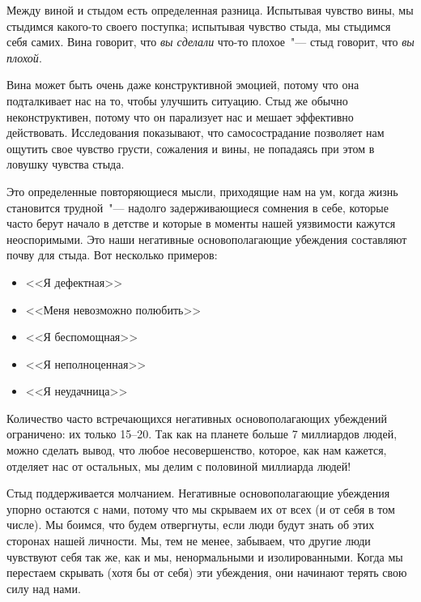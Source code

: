 Между виной и стыдом есть определенная разница. Испытывая чувство вины, мы стыдимся какого-то своего поступка; испытывая чувство стыда, мы стыдимся себя самих. Вина говорит, что \emph{вы сделали} что-то плохое~"--- стыд говорит, что \emph{вы плохой}. 

Вина может быть очень даже конструктивной эмоцией, потому что она подталкивает нас на то, чтобы улучшить ситуацию. Стыд же обычно неконструктивен, потому что он парализует нас и мешает эффективно действовать. Исследования показывают, что самосострадание позволяет нам ощутить свое чувство грусти, сожаления и вины, не попадаясь при этом в ловушку чувства стыда. 

\vspace{3ex}


\vspace{1ex}

Это определенные повторяющиеся мысли, приходящие нам на ум, когда жизнь становится 
трудной~"--- надолго задерживающиеся сомнения в себе, которые часто берут начало в детстве и которые в моменты нашей уязвимости кажутся неоспоримыми. Это наши негативные основополагающие убеждения составляют почву для стыда. Вот несколько примеров:
\begin{itemize}
	\item <<Я дефектная>>
	\item <<Меня невозможно полюбить>>
	\item <<Я беспомощная>>
	\item <<Я неполноценная>>
	\item <<Я неудачница>>
\end{itemize}

Количество часто встречающихся негативных основополагающих убеждений ограничено: их только 15--20. Так как на планете больше 7 миллиардов людей, можно сделать вывод, что любое несовершенство, которое, как нам кажется, отделяет нас от остальных, мы делим с половиной миллиарда людей!

Стыд поддерживается молчанием. Негативные основополагающие убеждения упорно остаются с нами, потому что мы скрываем их от всех (и от себя в том числе). Мы боимся, что будем отвергнуты, если люди будут знать об этих сторонах нашей личности. Мы, тем не менее, забываем, что другие люди чувствуют себя так же, как и мы, ненормальными и изолированными. Когда мы перестаем скрывать (хотя бы от себя) эти убеждения, они начинают терять свою силу над нами. 

